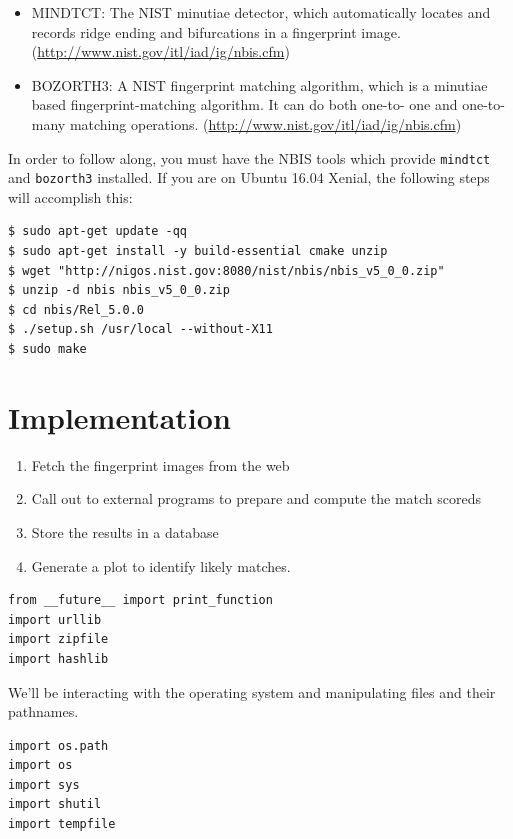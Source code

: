 \begin{itemize}
\item
  MINDTCT: The NIST minutiae detector, which automatically locates and
  records ridge ending and bifurcations in a fingerprint image.
  (\url{http://www.nist.gov/itl/iad/ig/nbis.cfm})
\item
  BOZORTH3: A NIST fingerprint matching algorithm, which is a minutiae
  based fingerprint-matching algorithm. It can do both one-to- one and
  one-to- many matching operations.
  (\url{http://www.nist.gov/itl/iad/ig/nbis.cfm})
\end{itemize}

In order to follow along, you must have the NBIS tools which provide
\texttt{mindtct} and \texttt{bozorth3} installed. If you are on Ubuntu
16.04 Xenial, the following steps will accomplish this:

\begin{lstlisting}
$ sudo apt-get update -qq
$ sudo apt-get install -y build-essential cmake unzip
$ wget "http://nigos.nist.gov:8080/nist/nbis/nbis_v5_0_0.zip"
$ unzip -d nbis nbis_v5_0_0.zip
$ cd nbis/Rel_5.0.0
$ ./setup.sh /usr/local --without-X11
$ sudo make
\end{lstlisting} 

\section{Implementation}\label{implementation}

\begin{enumerate}
\item Fetch the fingerprint images from the web
\item Call out to external programs to prepare and compute the match
  scoreds
\item Store the results in a database
\item Generate a plot to identify likely matches.
\end{enumerate}

\begin{lstlisting}
from __future__ import print_function
import urllib
import zipfile
import hashlib
\end{lstlisting}

We'll be interacting with the operating system and manipulating files
and their pathnames.

\begin{lstlisting}
import os.path
import os
import sys
import shutil
import tempfile
\end{lstlisting}

